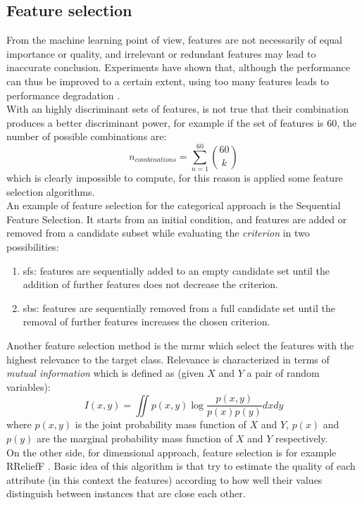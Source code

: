 \subsection{Feature selection}\label{feature_selection}
From the machine learning point of view, features are not necessarily of equal importance or quality, and irrelevant or redundant features may lead to inaccurate conclusion. Experiments have shown that, although the performance can thus be improved to a certain extent, using too many features leads to performance degradation \cite{zhang2017feature}.
\\
With an highly discriminant sets of features, is not true that their combination produces a better discriminant power, for example if the set of features is 60, the number of possible combinations are:
\begin{equation}
	n_{combinations} = \sum_{n=1}^{60} \binom{60}{k}
\end{equation}
which is clearly impossible to compute, for this reason is applied some feature selection algorithms.
\\ \indent
An example of feature selection for the categorical approach is the Sequential Feature Selection. It starts from an initial condition, and features are added or removed from a candidate subset while evaluating the \textit{criterion} in two possibilities:
\begin{enumerate}
	\item \gls{sfs}: features are sequentially added to an empty candidate set until the addition of further features does not decrease the criterion.
	\item \gls{sbs}: features are sequentially removed from a full candidate set until the removal of further features increases the chosen criterion.
\end{enumerate}
Another feature selection method is the \gls{mrmr} which select the features with the highest relevance to the target class. Relevance is characterized in terms of \textit{mutual information} which is defined as (given $X$ and $Y$ a pair of random variables):
\begin{equation}
	I(x,y)=\iint p(x,y) \log\dfrac{p(x,y)}{p(x)p(y)} dxdy
\end{equation}
where $p(x,y)$ is the joint probability mass function of $X$ and $Y$, $p(x)$ and $p(y)$ are the marginal probability mass function of $X$ and $Y$ respectively.
\\ \indent
On the other side, for dimensional approach, feature selection is for example RReliefF \cite{robnik2003theoretical}. Basic idea of this algorithm is that try to estimate the quality of each attribute (in this context the features) according to how well their values distinguish between instances that are close each other.
